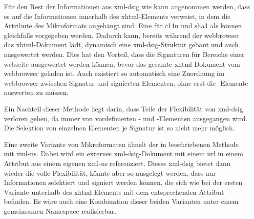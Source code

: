 Für den Rest der Informationen aus \gls{xml-dsig} wie  kann angenommen werden, dass es auf die Informationen innerhalb des
\gls{xhtml}-Elements verweist, in dem die Attribute des Mikroformats angehängt sind. Eine  für \gls{c14n} und \gls{sha1} als
 können gleichfalls vorgegeben werden. Dadurch kann, bereits während der \gls{webbrowser} das \gls{xhtml}-Dokument lädt, dynamisch eine
\gls{xml-dsig}-Struktur gebaut und auch ausgewertet werden. Dies hat den Vorteil, dass die Signaturen für Bereiche einer \gls{webseite} ausgewertet werden
können, bevor das gesamte \gls{xhtml}-Dokument vom \gls{webbrowser} geladen ist. Auch existiert so automatisch eine Zuordnung im \gls{webbrowser} zwischen
Signatur und signierten Elementen, ohne erst die -Elemente auswerten zu müssen.



Ein Nachteil dieser Methode liegt darin, dass Teile der Flexibilität von \gls{xml-dsig} verloren gehen, da immer von vordefinierten - und
-Elementen ausgegangen wird. Die Selektion von einzelnen Elementen je Signatur ist so nicht mehr möglich.

Eine zweite Variante von Mikroformaten ähnelt der in  beschriebenen Methode mit \gls{xml-ns}. Dabei wird ein externes
\gls{xml-dsig}-Dokument mit einem \gls{url} in einem Attribut aus einem eigenen \gls{xml-ns} referenziert. Dieses \gls{xml-dsig} bietet dann wieder die volle
Flexibilität, könnte aber so ausgelegt werden, dass nur Informationen selektiert und signiert werden können, die sich wie bei der ersten Variante unterhalb des
\gls{xhtml}-Elements mit dem entsprechenden Attribut befinden. Es wäre auch eine Kombination dieser beiden Varianten unter einem gemeinsamen Namespace
realisierbar.

